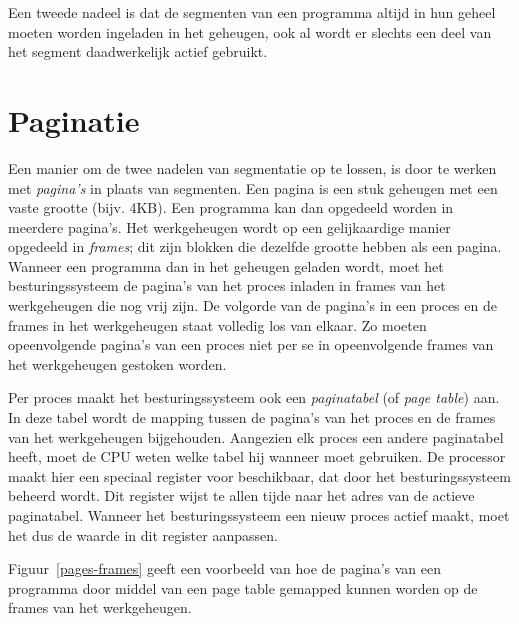 Een tweede nadeel is dat de segmenten van een programma altijd in hun geheel moeten worden ingeladen in het geheugen, ook al wordt er slechts een deel van het segment daadwerkelijk actief gebruikt.

\section{Paginatie}

Een manier om de twee nadelen van segmentatie op te lossen, is door te werken met \emph{pagina's} in plaats van segmenten. Een pagina is een stuk geheugen met een vaste grootte (bijv. 4KB). Een programma kan dan opgedeeld worden in meerdere pagina's. Het werkgeheugen wordt op een gelijkaardige manier opgedeeld in \emph{frames}; dit zijn blokken die dezelfde grootte hebben als een pagina. Wanneer een programma dan in het geheugen geladen wordt, moet het besturingssysteem de pagina's van het proces inladen in frames van het werkgeheugen die nog vrij zijn. De volgorde van de pagina's in een proces en de frames in het werkgeheugen staat volledig los van elkaar. Zo moeten opeenvolgende pagina's van een proces niet per se in opeenvolgende frames van het werkgeheugen gestoken worden.

Per proces maakt het besturingssysteem ook een \emph{paginatabel} (of \emph{page table}) aan. In deze tabel wordt de mapping tussen de pagina's van het proces en de frames van het werkgeheugen bijgehouden. Aangezien elk proces een andere paginatabel heeft, moet de CPU weten welke tabel hij wanneer moet gebruiken. De processor maakt hier een speciaal register voor beschikbaar, dat door het besturingssysteem beheerd wordt. Dit register wijst te allen tijde naar het adres van de actieve paginatabel. Wanneer het besturingssysteem een nieuw proces actief maakt, moet het dus de waarde in dit register aanpassen.

Figuur~\ref{pages-frames} geeft een voorbeeld van hoe de pagina's van een programma door middel van een page table gemapped kunnen worden op de frames van het werkgeheugen.

